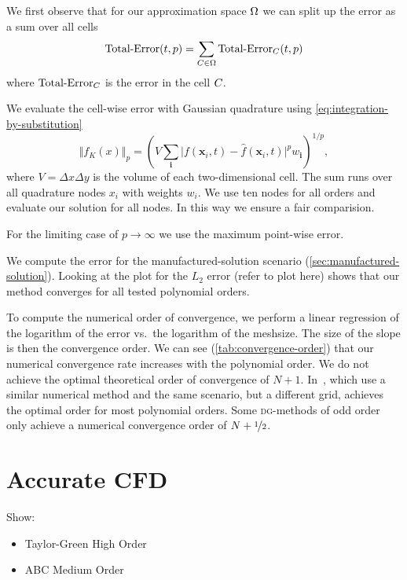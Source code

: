 We first observe that for our approximation space $\broken$ we can split up the error as a sum over all cells
\begin{equation}
  \label{eq:lp-norm-broken}
  \error(t,p) = \sum_{\cell[] \in \broken} \error_{\cell[]}(t,p)
\end{equation}
where $\error_{\cell[]}$ is the error in the cell $\cell[]$.

We evaluate the cell-wise error with Gaussian quadrature using \cref{eq:integration-by-substitution}
 \begin{equation}
   \Vert f_K(x) \Vert_p = \left( V \sum_{\bm{i}} \vert f(\bm{x}_i, t) - \hat{f}(\bm{x}_i, t) \vert^p w_{{\bm{i}}}  \right)^{1/p},
 \end{equation}
where $V = \Delta x \Delta y$ is the volume of each two-dimensional cell.
The sum runs over all quadrature nodes $x_i$ with weights $w_i$.
We use ten nodes for all orders and evaluate our solution for all nodes.
In this way we ensure a fair comparision.

For the limiting case of $p \to \infty$ we use the maximum point-wise error.


We compute the error for the manufactured-solution scenario (\cref{sec:manufactured-solution}).
Looking at the plot for the $L_2$ error (refer to plot here) shows that our method converges for all tested polynomial orders.

To compute the numerical order of convergence, we perform a linear regression of the logarithm of the error vs.\ the logarithm of the meshsize.
The size of the slope is then the convergence order.
We can see (\cref{tab:convergence-order}) that our numerical convergence rate increases with the polynomial order.
We do not achieve the optimal theoretical order of convergence of $N+1$.
In~\cite{dumbser2010arbitrary}, which use a similar numerical method and the same scenario, but a different grid, \citeauthor{dumbser2010arbitrary} achieves the optimal order for most polynomial orders.
Some \textsc{dg}-methods of odd order only achieve a numerical convergence order of $N+\nicefrac{1}{2}$.

\section{Accurate CFD}
Show:
\begin{itemize}
\item Taylor-Green High Order
\item ABC Medium Order
\end{itemize}
